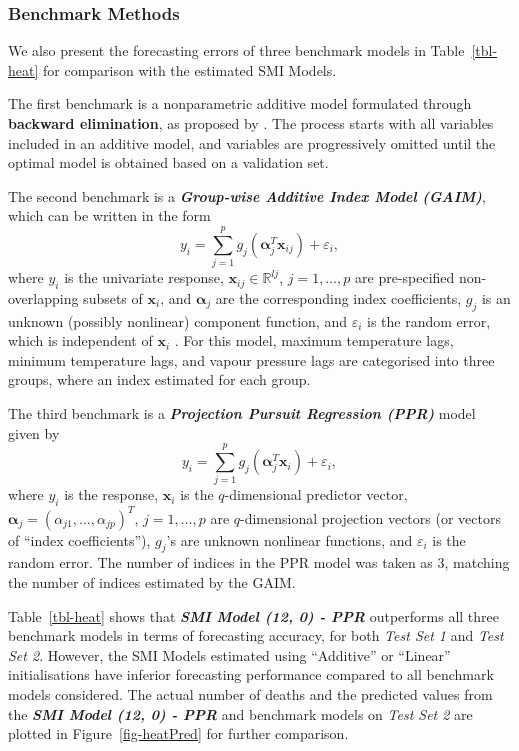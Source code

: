 \documentclass[
  11pt,
  a4paper,
]{article}
\begin{document}
\subsubsection{Benchmark Methods}\label{sec-benchmark}

We also present the forecasting errors of three benchmark models in
Table~\ref{tbl-heat} for comparison with the estimated SMI Models.

The first benchmark is a nonparametric additive model formulated through
\textbf{backward elimination}, as proposed by \textcite{FH2012}. The
process starts with all variables included in an additive model, and
variables are progressively omitted until the optimal model is obtained
based on a validation set.

The second benchmark is a \textbf{\emph{Group-wise Additive Index Model
(GAIM)}}, which can be written in the form \[
  y_{i} = \sum_{j = 1}^{p} g_{j}(\bm{\alpha}_{j}^{T}\bm{x}_{ij}) + \varepsilon_{i}, 
\] where \(y_{i}\) is the univariate response,
\(\bm{x}_{ij} \in \mathbb{R}^{l{j}}\), \(j = 1, \dots, p\) are
pre-specified non-overlapping subsets of \(\bm{x}_{i}\), and
\(\bm{\alpha}_j\) are the corresponding index coefficients, \(g_{j}\) is
an unknown (possibly nonlinear) component function, and
\(\varepsilon_{i}\) is the random error, which is independent of
\(\bm{x}_{i}\) \autocite{Wang2015-mp,Masselot2022}. For this model,
maximum temperature lags, minimum temperature lags, and vapour pressure
lags are categorised into three groups, where an index estimated for
each group.

The third benchmark is a \textbf{\emph{Projection Pursuit Regression
(PPR)}} model \autocite{Friedman1981} given by \[
  y_{i} = \sum_{j=1}^{p} {g_{j}(\bm{\alpha}_{j}^{T}\bm{x}_{i})} + \varepsilon_{i},
\] where \(y_{i}\) is the response, \(\bm{x}_{i}\) is the
\(q\)-dimensional predictor vector,
\(\bm{\alpha}_{j} = ( \alpha_{j1}, \dots, \alpha_{jp} )^{T}\),
\(j = 1, \dots, p\) are \(q\)-dimensional projection vectors (or vectors
of ``index coefficients''), \(g_{j}\)'s are unknown nonlinear functions,
and \(\varepsilon_{i}\) is the random error. The number of indices in
the PPR model was taken as 3, matching the number of indices estimated
by the GAIM.

Table~\ref{tbl-heat} shows that \textbf{\emph{SMI Model (12, 0) - PPR}}
outperforms all three benchmark models in terms of forecasting accuracy,
for both \emph{Test Set 1} and \emph{Test Set 2}. However, the SMI
Models estimated using ``Additive'' or ``Linear'' initialisations have
inferior forecasting performance compared to all benchmark models
considered. The actual number of deaths and the predicted values from
the \textbf{\emph{SMI Model (12, 0) - PPR}} and benchmark models on
\emph{Test Set 2} are plotted in Figure~\ref{fig-heatPred} for further
comparison.
\end{document}

